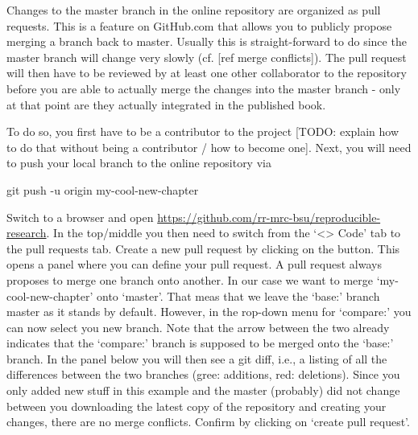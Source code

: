 \documentclass[]{book}
\newenvironment{Shaded}{\begin{snugshade}}{\end{snugshade}}
\newcommand{\FunctionTok}[1]{\textcolor[rgb]{0.00,0.00,0.00}{#1}}
\newcommand{\NormalTok}[1]{#1}
\begin{document}
Changes to the master branch in the online repository are organized as
pull requests. This is a feature on GitHub.com that allows you to
publicly propose merging a branch back to master. Usually this is
straight-forward to do since the master branch will change very slowly
(cf. {[}ref merge conflicts{]}). The pull request will then have to be
reviewed by at least one other collaborator to the repository before you
are able to actually merge the changes into the master branch - only at
that point are they actually integrated in the published book.

To do so, you first have to be a contributor to the project {[}TODO:
explain how to do that without being a contributor / how to become
one{]}. Next, you will need to push your local branch to the online
repository via

\begin{Shaded}
\begin{Highlighting}[]
\FunctionTok{git}\NormalTok{ push -u origin my-cool-new-chapter}
\end{Highlighting}
\end{Shaded}

Switch to a browser and open
\url{https://github.com/rr-mrc-bsu/reproducible-research}. In the
top/middle you then need to switch from the `\textless{}\textgreater{}
Code' tab to the pull requests tab. Create a new pull request by
clicking on the button. This opens a panel where you can define your
pull request. A pull request always proposes to merge one branch onto
another. In our case we want to merge `my-cool-new-chapter' onto
`master'. That meas that we leave the `base:' branch master as it stands
by default. However, in the rop-down menu for `compare:' you can now
select you new branch. Note that the arrow between the two already
indicates that the `compare:' branch is supposed to be merged onto the
`base:' branch. In the panel below you will then see a git diff, i.e., a
listing of all the differences between the two branches (gree:
additions, red: deletions). Since you only added new stuff in this
example and the master (probably) did not change between you downloading
the latest copy of the repository and creating your changes, there are
no merge conflicts. Confirm by clicking on `create pull request'.
\end{document}
